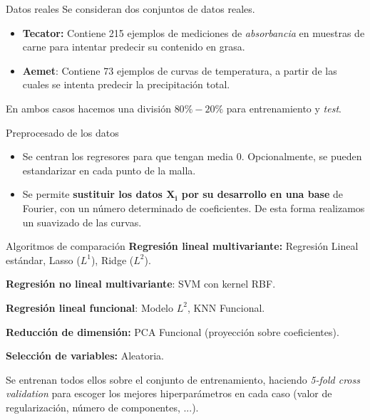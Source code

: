 \documentclass[10pt, spanish, professionalfonts]{beamer}
\begin{document}
\begin{frame}{Datos reales}
  Se consideran dos conjuntos de datos reales.
  \begin{itemize}
    \item \textbf{Tecator:} Contiene 215 ejemplos de mediciones de \textit{absorbancia} en muestras de carne para intentar predecir su contenido en grasa.
    \item \textbf{Aemet}: Contiene 73 ejemplos de curvas de temperatura, a partir de las cuales se intenta predecir la precipitación total.
  \end{itemize}

  En ambos casos hacemos una división \(80\%-20\%\) para entrenamiento y \textit{test}.
\end{frame}

\begin{frame}{Preprocesado de los datos}
  \begin{itemize}
    \item Se centran los regresores para que tengan media \(0\). Opcionalmente, se pueden estandarizar en cada punto de la malla.
    \item Se permite \textbf{sustituir los datos \(\boldsymbol{X_i}\) por su desarrollo en una base} de Fourier, con un número determinado de coeficientes. De esta forma realizamos un suavizado de las curvas.
  \end{itemize}
\end{frame}

\begin{frame}{Algoritmos de comparación}
  \textbf{Regresión lineal multivariante:} Regresión Lineal estándar, Lasso (\(L^1\)), Ridge (\(L^2\)).

  \textbf{Regresión no lineal multivariante}: SVM con kernel RBF.

  \textbf{Regresión lineal funcional}: Modelo \(L^2\), KNN Funcional.

  \textbf{Reducción de dimensión:} PCA Funcional (proyección sobre coeficientes).

  \textbf{Selección de variables:} Aleatoria.

  \vspace{1em}

  Se entrenan todos ellos sobre el conjunto de entrenamiento, haciendo \textit{5-fold cross validation} para escoger los mejores hiperparámetros en cada caso (valor de regularización, número de componentes, ...).
\end{frame}
\end{document}
